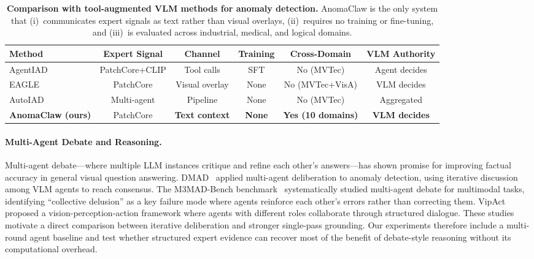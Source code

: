 \begin{table}[t]
\centering
\caption{%
    \textbf{Comparison with tool-augmented VLM methods for anomaly detection.}
    AnomaClaw is the only system that (i)~communicates expert signals as text rather than visual overlays, (ii)~requires no training or fine-tuning, and (iii)~is evaluated across industrial, medical, and logical domains.
}
\label{tab:related_comparison}
\small
\setlength{\tabcolsep}{3pt}
\begin{tabular}{@{}lccccc@{}}
\toprule
Method & Expert Signal & Channel & Training & Cross-Domain & VLM Authority \\
\midrule
AgentIAD~\citeyear{zhang2025agentiad}  & PatchCore+CLIP & Tool calls & SFT & No (MVTec) & Agent decides \\
EAGLE~\citeyear{chen2026eagle}         & PatchCore      & Visual overlay & None & No (MVTec+VisA) & VLM decides \\
AutoIAD~\citeyear{wei2025autoiad}      & Multi-agent    & Pipeline & None & No (MVTec) & Aggregated \\
\textbf{AnomaClaw (ours)}              & PatchCore      & \textbf{Text context} & \textbf{None} & \textbf{Yes (10 domains)} & \textbf{VLM decides} \\
\bottomrule
\end{tabular}
\end{table}

\paragraph{Multi-Agent Debate and Reasoning.}
Multi-agent debate---where multiple LLM instances critique and refine each other's answers---has shown promise for improving factual accuracy in general visual question answering.
DMAD~\cite{li2025dmad} applied multi-agent deliberation to anomaly detection, using iterative discussion among VLM agents to reach consensus.
The M3MAD-Bench benchmark~\cite{liang2026m3mad} systematically studied multi-agent debate for multimodal tasks, identifying ``collective delusion'' as a key failure mode where agents reinforce each other's errors rather than correcting them.
VipAct~\cite{li2026vipact} proposed a vision-perception-action framework where agents with different roles collaborate through structured dialogue.
These studies motivate a direct comparison between iterative deliberation and stronger single-pass grounding.
Our experiments therefore include a multi-round agent baseline and test whether structured expert evidence can recover most of the benefit of debate-style reasoning without its computational overhead.

